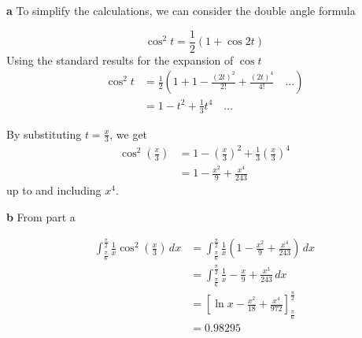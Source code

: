 \documentclass[
  a4paper,
]{report}
\begin{document}
\begin{tcolorbox}[enhanced jigsaw, title={Solution}, titlerule=0mm, colbacktitle=quarto-callout-tip-color!10!white, coltitle=black, toprule=.15mm, colframe=quarto-callout-tip-color-frame, breakable, bottomtitle=1mm, toptitle=1mm, arc=.35mm, rightrule=.15mm, bottomrule=.15mm, left=2mm, opacitybacktitle=0.6, leftrule=.75mm, opacityback=0, colback=white]

\textbf{a} To simplify the calculations, we can consider the double
angle formula

\[\cos^2 t = \frac{1}{2}(1+\cos 2t)\] Using the standard results for the
expansion of \(\cos t\) \begin{equation*}
\begin{split}
\cos^2 t &= \frac{1}{2}(1+1-\frac{(2t)^2}{2!}+\frac{(2t)^4}{4!}\quad ...) \\
&=1-t^2+\frac{1}{3}t^4\quad ...
\end{split}
\end{equation*}

By substituting \(t=\frac{x}{3}\), we get \begin{equation*}
\begin{split}
\cos^2 \left(\frac{x}{3}\right) &= 1-\left(\frac{x}{3}\right)^2+\frac{1}{3}\left(\frac{x}{3}\right)^4 \\
&=1-\frac{x^2}{9}+\frac{x^4}{243}
\end{split}
\end{equation*} up to and including \(x^4\).

\textbf{b} From part a

\begin{equation*}
\begin{split}
\int_{\frac{\pi}{6}}^{\frac{\pi}{2}} \frac{1}{x} \cos ^2\left(\frac{x}{3}\right) \,dx &= \int_{\frac{\pi}{6}}^{\frac{\pi}{2}} \frac{1}{x} \left(1-\frac{x^2}{9}+\frac{x^4}{243}\right) \,dx \\
&= \int_{\frac{\pi}{6}}^{\frac{\pi}{2}} \frac{1}{x} -\frac{x}{9}+\frac{x^3}{243} \,dx \\
&=\left[ \ln x - \frac{x^2}{18} + \frac{x^4}{972}\right]_{\frac{\pi}{6}}^{\frac{\pi}{2}} \\
&= 0.98295 
\end{split}
\end{equation*}

\end{tcolorbox}
\end{document}
